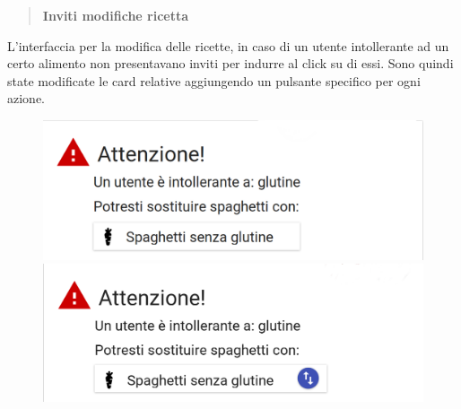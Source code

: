 \begin{quote}
	\textbf{Inviti modifiche ricetta}
\end{quote}

L'interfaccia per la modifica delle ricette, in caso di un utente intollerante
ad un certo alimento non presentavano inviti per indurre al click su
di essi.  Sono quindi state modificate le card relative aggiungendo un pulsante
specifico per ogni azione.
\begin{figure}[H]
	\begin{minipage}{.49\textwidth}
		\includegraphics[width=\textwidth]{img/modifiche/cambia_ingrediente_old.png}
	\end{minipage}
	\begin{minipage}{.49\textwidth}
		\includegraphics[width=\textwidth]{img/modifiche/cambia_ingrediente_new.png}
	\end{minipage}
\end{figure}

